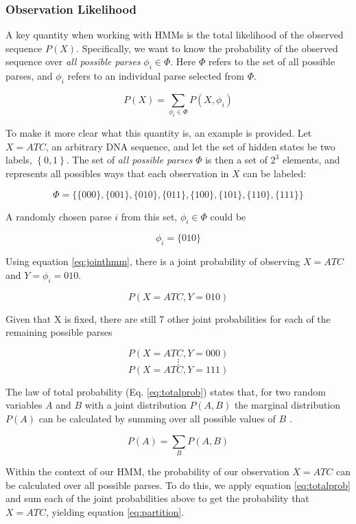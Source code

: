 \subsubsection{Observation Likelihood}
A key quantity when working with HMMs is the total likelihood of the observed sequence $P(X)$. Specifically, we want to know the probability of the observed sequence over \emph{all possible parses} $\phi_i \in \Phi$. Here $\Phi$ refers to the set of all possible parses, and $\phi_i$ refers to an individual parse selected from $\Phi$. 

\begin{equation}
 P(X) = \sum_{\phi_i \in \Phi}{P(X,\phi_i)}  
\label{eq:partition}
\end{equation}

To make it more clear what this quantity is, an example is provided. Let $X = ATC$, an arbitrary DNA sequence, and let the set of hidden states be two labels, $\left\{0,1\right\}$. The set of \emph{all possible parses} $\Phi$ is then a set of $2^3$ elements, and represents all possibles ways that each observation in $X$ can be labeled:

$$\Phi = \{\{000\},\{001\},\{010\},\{011\},\{100\},\{101\},\{110\},\{111\}\}$$

A randomly chosen parse $i$ from this set, $\phi_i \in \Phi$ could be

$$\phi_i = \{010\}$$

Using equation \ref{eq:jointhmm}, there is a joint probability of observing $X=ATC$ and $Y = \phi_i = 010$.

$$P(X=ATC,Y=010)$$

Given that X is fixed, there are still 7 other joint probabilities for each of the remaining possible parses

$$P(X=ATC,Y=000)$$
$$\vdots$$
$$P(X=ATC,Y=111)$$

The law of total probability (Eq. \ref{eq:totalprob}) states that, for two random variables $A$ and $B$ with a joint distribution $P(A,B)$ the marginal distribution $P(A)$ can be calculated by summing over all possible values of $B$ \cite{Brookes1951FoundationsProbability}.

\begin{equation}
    P(A) = \sum_B{P(A,B)}
\label{eq:totalprob}
\end{equation}

Within the context of our HMM, the probability of our observation $X=ATC$ can be calculated over all possible parses. To do this, we apply equation \ref{eq:totalprob} and sum each of the joint probabilities above to get the probability that $X=ATC$, yielding equation \ref{eq:partition}.

